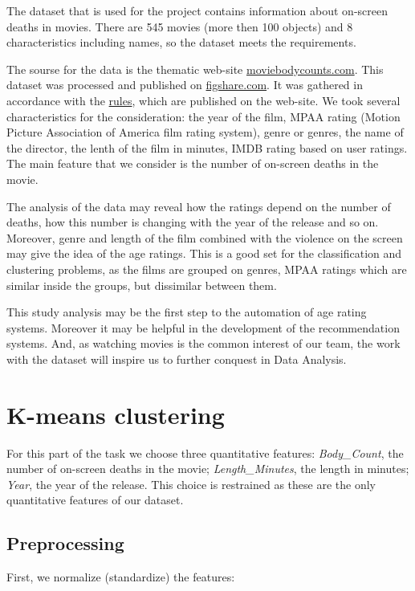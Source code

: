 \documentclass[a4paper,14pt]{article}
\begin{document}
    
    The dataset that is used for the project contains information about  on-screen deaths in movies. There are 545 movies (more then 100 objects) and 8 characteristics including names, so the dataset meets the requirements. 
    
    The sourse for the data is the thematic web-site \href{http://www.moviebodycounts.com/}{moviebodycounts.com}. This dataset was processed and published on \href{https://figshare.com/articles/On_screen_movie_kill_counts_for_hundreds_of_films/889719}{figshare.com}. It was gathered  in accordance with the \href{http://moviebodycounts.proboards.com/thread/6}{rules}, which are published on the web-site. We took several characteristics for the consideration: the year of the film, MPAA rating (Motion Picture Association of America film rating system), genre or genres, the name of the director, the lenth of the film in minutes,  IMDB rating based on user ratings. The main feature that we consider is the number of on-screen deaths in the movie. 
    
    The analysis of the data may reveal how the ratings depend on the number of deaths, how this  number is changing with the year of the release and so on. Moreover, genre and length of the film combined with the violence on the screen may give the idea of the age ratings. This is a good set for the classification and clustering problems, as the films are grouped on genres, MPAA ratings which are similar inside the groups, but dissimilar between them. 
    
    This study analysis may be the first step to the automation of age rating systems. Moreover it may be helpful in the development of the recommendation systems. And, as watching movies is the common interest of our team, the work with the dataset will inspire us to further conquest in Data Analysis.
    
    
    \newpage
    
    \section{K-means clustering}
    
 For this part of the task we choose three quantitative features:\textit{ Body\_Count}, the number of on-screen deaths in the movie; \textit{Length\_Minutes}, the length in minutes; \textit{Year}, the year of the release. This choice is restrained as these are the only quantitative features of our dataset. 
 
 \subsection{Preprocessing}
 First, we normalize (standardize) the features:
 
\end{document}
